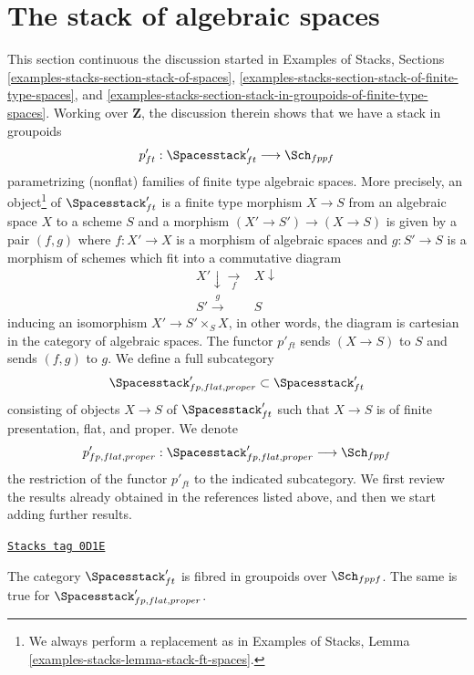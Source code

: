 \section{The stack of algebraic spaces}
\label{quot-section-stack-of-spaces}
This section continuous the discussion started in
Examples of Stacks, Sections
\ref{examples-stacks-section-stack-of-spaces},
\ref{examples-stacks-section-stack-of-finite-type-spaces}, and
\ref{examples-stacks-section-stack-in-groupoids-of-finite-type-spaces}.
Working over $\mathbf{Z}$, the discussion therein shows
that we have a stack in groupoids
$$
p'_{ft} : \Spacesstack'_{ft} \longrightarrow \Sch_{fppf}
$$
parametrizing (nonflat) families of finite type algebraic spaces.
More precisely, an object\footnote{We always perform a replacement as in
Examples of Stacks, Lemma \ref{examples-stacks-lemma-stack-ft-spaces}.}
of $\Spacesstack'_{ft}$ is a finite type morphism $X \to S$
from an algebraic space $X$ to a scheme $S$ and a morphism
$(X' \to S') \to (X \to S)$ is given by a pair $(f, g)$
where $f : X' \to X$ is a morphism of algebraic spaces
and $g : S' \to S$ is a morphism of schemes
which fit into a commutative diagram
$$
\begin{array}{cc}X' \downarrow\underset{f}{\longrightarrow} & X \downarrow \\ S' \overset{g}{\longrightarrow} & S\end{array}
$$
inducing an isomorphism $X' \to S' \times_S X$, in other words, the
diagram is cartesian in the category of algebraic spaces.
The functor $p'_{ft}$ sends $(X \to S)$ to $S$ and sends
$(f, g)$ to $g$. We define a full subcategory
$$
\Spacesstack'_{fp, flat, proper} \subset
\Spacesstack'_{ft}
$$
consisting of objects $X \to S$ of $\Spacesstack'_{ft}$
such that $X \to S$ is of finite presentation, flat, and proper.
We denote
$$
p'_{fp, flat, proper} :
\Spacesstack'_{fp, flat, proper}
\longrightarrow
\Sch_{fppf}
$$
the restriction of the functor $p'_{ft}$ to the indicated subcategory.
We first review the results already obtained in the references
listed above, and then we start adding further results.

\begin{lemma}
\label{quot-lemma-spaces-fibred-in-groupoids}
\href{https://stacks.math.columbia.edu/tag/0D1E}{\texttt{Stacks tag 0D1E}}

The category $\Spacesstack'_{ft}$ is fibred in groupoids
over $\Sch_{fppf}$. The same is true for
$\Spacesstack'_{fp, flat, proper}$.
\end{lemma}

